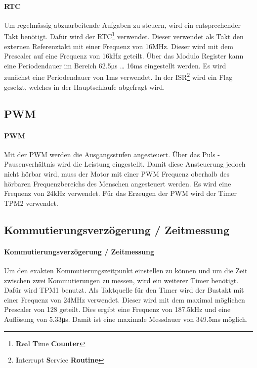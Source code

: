 \paragraph{RTC}$~~$\vspace{2mm}\\
\fi
\label{sec:rtc}
Um regelmässig abzuarbeitende Aufgaben zu steuern, wird ein entsprechender 
Takt benötigt. Dafür wird der RTC\footnote{\textbf{R}eal \textbf{T}ime 
\textbf{Counter}} verwendet. Dieser verwendet als Takt den externen 
Referenztakt mit einer Frequenz von 16\si{\mega\hertz}. Dieser wird mit dem 
Prescaler auf eine Frequenz von 16\si{\kilo\hertz} geteilt. Über das Modulo 
Register kann eine Periodendauer im Bereich 62.5\si{\micro\second} \ldots 
16\si{\milli\second} eingestellt werden. Es wird zunächst eine Periodendauer 
von 1\si{\milli\second} verwendet. In der ISR\footnote{\textbf{I}nterrupt 
\textbf{S}ervice \textbf{Routine}} wird ein Flag gesetzt, welches in der 
Hauptschlaufe abgefragt wird. 

\ifSTANDALONE
\subsection{PWM}
\fi
\ifEMBED
\paragraph{PWM}$~~$\vspace{2mm}\\
\fi
Mit der PWM werden 
die Ausgangsstufen angesteuert. Über das Puls - Pausenverhältnis wird die 
Leistung eingestellt. Damit diese Ansteuerung jedoch nicht hörbar wird, muss 
der Motor mit einer PWM Frequenz oberhalb des hörbaren Frequenzbereichs des 
Menschen angesteuert werden. Es wird eine Frequenz von 24\si{\kilo\hertz} 
verwendet.  Für das Erzeugen der PWM wird der Timer TPM2 verwendet. 

\ifSTANDALONE
\subsection{Kommutierungsverzögerung / Zeitmessung}
\fi
\ifEMBED
\paragraph{Kommutierungsverzögerung / Zeitmessung}$~~$\vspace{2mm}\\
\fi
Um den exakten Kommutierungszeitpunkt einstellen zu können und um die Zeit 
zwischen zwei Kommutierungen zu messen, wird ein weiterer Timer benötigt. Dafür 
wird TPM1 benutzt. Als Taktquelle für den Timer wird der Bustakt mit einer 
Frequenz von 24\si{\mega\hertz} verwendet. Dieser wird mit dem maximal möglichen 
Prescaler von 128 geteilt. Dies ergibt eine Frequenz von 187.5\si{\kilo\hertz} 
und eine Auflösung von 5.33\si{\micro\second}. Damit ist eine maximale 
Messdauer von 349.5\si{\milli\second} möglich. 

